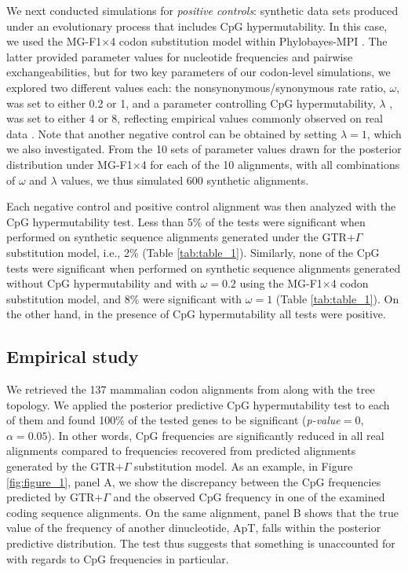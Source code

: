 \documentclass{article}
\begin{document}
We next conducted simulations for \emph{positive controls}: synthetic data sets produced under an evolutionary process that includes CpG hypermutability.  In this case, we used the MG-F1$\times$4 codon substitution model \citep[see, e.g.,][for a detailed description]{Rodrigue2008} within Phylobayes-MPI \citep{Rodrigue2014}.  The latter provided parameter values for nucleotide frequencies and pairwise exchangeabilities, but for two key parameters of our codon-level simulations, we explored two different values each: the nonsynonymous/synonymous rate ratio, $\omega$, was set to either 0.2 or 1, and a parameter controlling CpG hypermutability, $\lambda$ \citep[see][for a detailed description]{LaurinLemay2018b}, was set to either 4 or 8, reflecting empirical values commonly observed on real data \citep{LaurinLemay2018b}.  Note that another negative control can be obtained by setting $\lambda=1$, which we also investigated.  From the 10 sets of parameter values drawn for the posterior distribution under MG-F1$\times$4 for each of the 10 alignments, with all combinations of $\omega$ and $\lambda$ values, we thus simulated 600 synthetic alignments.

Each negative control and positive control alignment was then analyzed with the CpG hypermutability test.  Less than 5\% of the tests were significant when performed on synthetic sequence alignments generated under the GTR+$\Gamma$ substitution model, i.e., 2\% (Table \ref{tab:table_1}).  Similarly, none of the CpG tests were significant when performed on synthetic sequence alignments generated without CpG hypermutability and with $\omega = 0.2$ using the MG-F1$\times$4 codon substitution model, and 8\% were significant with $\omega=1$ (Table \ref{tab:table_1}).  On the other hand, in the presence of CpG hypermutability all tests were positive.

\subsection*{Empirical study}
We retrieved the 137 mammalian codon alignments from \citet{LaurinLemay2018a} along with the tree topology.  We applied the posterior predictive CpG hypermutability test to each of them and found 100\% of the tested genes to be significant (\emph{p-value}$=0$, $\alpha=0.05$).  In other words, CpG frequencies are significantly reduced in all real alignments compared to frequencies recovered from predicted alignments generated by the GTR$+\Gamma$ substitution model.  As an example, in Figure \ref{fig:figure_1}, panel A, we show the discrepancy between the CpG frequencies predicted by GTR$+\Gamma$ and the observed CpG frequency in one of the examined coding sequence alignments.  On the same alignment, panel B shows that the true value of the frequency of another dinucleotide, ApT, falls within the posterior predictive distribution.  The test thus suggests that something is unaccounted for with regards to CpG frequencies in particular.
\end{document}
